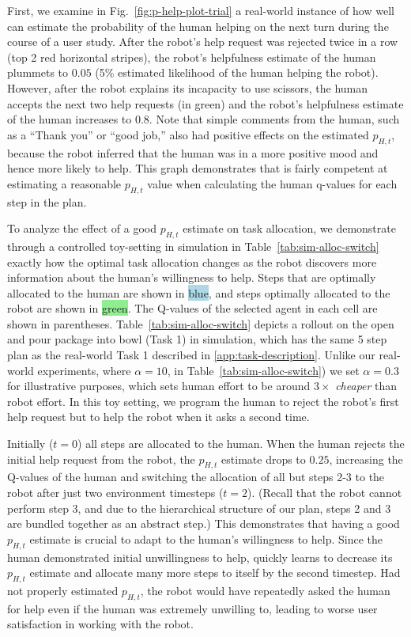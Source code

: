 First, we examine in Fig.~\ref{fig:p-help-plot-trial} a real-world instance of how well \ours{} can estimate the probability of the human helping on the next turn during the course of a user study. After the robot's help request was rejected twice in a row (top 2 red horizontal stripes), the robot's helpfulness estimate of the human plummets to $0.05$ (5\% estimated likelihood of the human helping the robot). However, after the robot explains its incapacity to use scissors, the human accepts the next two help requests (in green) and the robot's helpfulness estimate of the human increases to $0.8$. Note that simple comments from the human, such as a ``Thank you'' or ``good job,'' also had positive effects on the estimated $p_{H, t}$, because the robot inferred that the human was in a more positive mood and hence more likely to help. This graph demonstrates that \ours{} is fairly competent at estimating a reasonable $p_{H, t}$ value when calculating the human q-values for each step in the plan.

To analyze the effect of a good $p_{H, t}$ estimate on task allocation, we demonstrate through a controlled toy-setting in simulation in Table~\ref{tab:sim-alloc-switch} exactly how the optimal task allocation changes as the robot discovers more information about the human's willingness to help. Steps that are optimally allocated to the human are shown in \colorbox{LightBlue}{blue}, and steps optimally allocated to the robot are shown in \colorbox{LightGreen}{green}. The Q-values of the selected agent in each cell are shown in parentheses. Table~\ref{tab:sim-alloc-switch} depicts a rollout on the open and pour package into bowl (Task 1) in simulation, which has the same 5 step plan as the real-world Task 1 described in \ref{app:task-description}. Unlike our real-world experiments, where $\alpha=10$, in Table~\ref{tab:sim-alloc-switch}) we set $\alpha=0.3$ for illustrative purposes, which sets human effort to be around $3\times$ \textit{cheaper} than robot effort. In this toy setting, we program the human to reject the robot's first help request but to help the robot when it asks a second time.

Initially ($t=0$) all steps are allocated to the human. When the human rejects the initial help request from the robot, the $p_{H, t}$ estimate drops to $0.25$, increasing the Q-values of the human and switching the allocation of all but steps 2-3 to the robot after just two environment timesteps ($t=2$). (Recall that the robot cannot perform step 3, and due to the hierarchical structure of our plan, steps 2 and 3 are bundled together as an abstract step.) This demonstrates that having a good $p_{H, t}$ estimate is crucial to adapt to the human's willingness to help. Since the human demonstrated initial unwillingness to help, \ours{} quickly learns to decrease its $p_{H, t}$ estimate and allocate many more steps to itself by the second timestep. Had \ours{} not properly estimated $p_{H, t}$, the robot would have repeatedly asked the human for help even if the human was extremely unwilling to, leading to worse user satisfaction in working with the robot.

